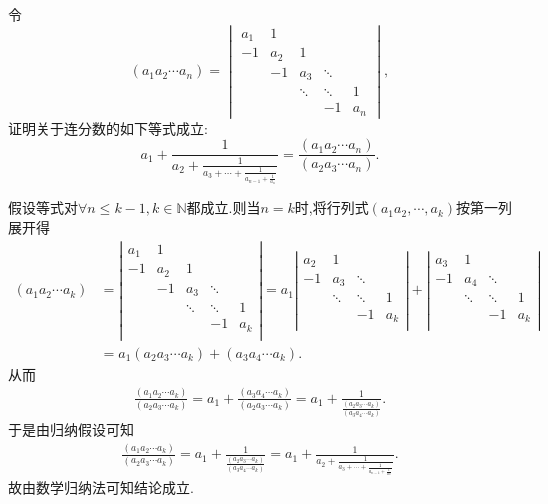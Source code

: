 \documentclass[../../main.tex]{subfiles}%
\begin{document}
\begin{example}
令
\[
\left( a_{1} a_{2} \cdots a_{n} \right) = 
\begin{vmatrix}
a_{1} & 1 &   &   &   \\
-1 & a_{2} & 1 &   &   \\
& -1 & a_{3} & \ddots &   \\
&   & \ddots & \ddots & 1 \\
&   &   & -1 & a_{n}
\end{vmatrix},
\]
证明关于连分数的如下等式成立:
\[
a_{1} + \frac{1}{a_{2} + \frac{1}{a_{3} + \cdots + \frac{1}{a_{n - 1} + \frac{1}{a_{n}}}}} = \frac{\left( a_{1} a_{2} \cdots a_{n} \right)}{\left( a_{2} a_{3} \cdots a_{n} \right)}.
\]
\end{example}
\begin{solution}
假设等式对$\forall n\leqslant  k-1,k\in \mathbb{N}$都成立.则当$n=k$时,将行列式$(a_1a_2,\cdots,a_k)$按第一列展开得
\begin{align*}
\left( a_1a_2\cdots a_k \right) &=\left| \begin{matrix}
a_1&		1&		&		&		\\
-1&		a_2&		1&		&		\\
&		-1&		a_3&		\ddots&		\\
&		&		\ddots&		\ddots&		1\\
&		&		&		-1&		a_k\\
\end{matrix} \right|=a_1\left| \begin{matrix}
a_2&		1&		&		\\
-1&		a_3&		\ddots&		\\
&		\ddots&		\ddots&		1\\
&		&		-1&		a_k\\
\end{matrix} \right|+\left| \begin{matrix}
a_3&		1&		&		\\
-1&		a_4&		\ddots&		\\
&		\ddots&		\ddots&		1\\
&		&		-1&		a_k\\
\end{matrix} \right|
\\
&=a_1\left( a_2a_3\cdots a_k \right) +\left( a_3a_4\cdots a_k \right).
\end{align*}
从而
\begin{align*}
\frac{\left( a_1a_2\cdots a_k \right)}{\left( a_2a_3\cdots a_k \right)}=a_1+\frac{\left( a_3a_4\cdots a_k \right)}{\left( a_2a_3\cdots a_k \right)}=a_1+\frac{1}{\frac{\left( a_2a_3\cdots a_k \right)}{\left( a_3a_4\cdots a_k \right)}}.
\end{align*}
于是由归纳假设可知
\begin{align*}
\frac{\left( a_1a_2\cdots a_k \right)}{\left( a_2a_3\cdots a_k \right)}=a_1+\frac{1}{\frac{\left( a_2a_3\cdots a_k \right)}{\left( a_3a_4\cdots a_k \right)}}=a_1+\frac{1}{a_2+\frac{1}{a_3+\cdots +\frac{1}{a_{n-1}+\frac{1}{a_n}}}}.
\end{align*}
故由数学归纳法可知结论成立.

\end{solution}
\end{document}
